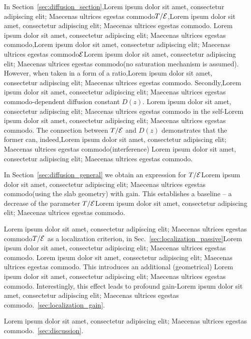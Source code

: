 In Section~\ref{sec:diffusion_section},Lorem ipsum dolor sit amet, consectetur adipiscing elit; Maecenas ultrices egestas commodo$T/{\cal E}$,Lorem ipsum dolor sit amet, consectetur adipiscing elit; Maecenas ultrices egestas commodo. Lorem ipsum dolor sit amet, consectetur adipiscing elit; Maecenas ultrices egestas commodo,Lorem ipsum dolor sit amet, consectetur adipiscing elit; Maecenas ultrices egestas commodo${\cal E}$Lorem ipsum dolor sit amet, consectetur adipiscing elit; Maecenas ultrices egestas commodo(no saturation mechanism is assumed). However, when taken in a form of a ratio,Lorem ipsum dolor sit amet, consectetur adipiscing elit; Maecenas ultrices egestas commodo. Secondly,Lorem ipsum dolor sit amet, consectetur adipiscing elit; Maecenas ultrices egestas commodo-dependent diffusion constant $D(z)$. Lorem ipsum dolor sit amet, consectetur adipiscing elit; Maecenas ultrices egestas commodo\cite{2008_Cherroret,2010_Payne_PRL} in the self-Lorem ipsum dolor sit amet, consectetur adipiscing elit; Maecenas ultrices egestas commodo. The connection between $T/{\cal E}$ and $D(z)$ demonstrates that the former can, indeed,Lorem ipsum dolor sit amet, consectetur adipiscing elit; Maecenas ultrices egestas commodo(interference) Lorem ipsum dolor sit amet, consectetur adipiscing elit; Maecenas ultrices egestas commodo.

In Section~\ref{sec:diffusion_general} we obtain an expression for $T/{\cal E}$Lorem ipsum dolor sit amet, consectetur adipiscing elit; Maecenas ultrices egestas commodo(using the slab geometry) with gain. This establishes a baseline -- a decrease of the parameter $T/{\cal E}$Lorem ipsum dolor sit amet, consectetur adipiscing elit; Maecenas ultrices egestas commodo.

Lorem ipsum dolor sit amet, consectetur adipiscing elit; Maecenas ultrices egestas commodo$T/{\cal E}$ as a localization criterion, in Sec.~\ref{sec:localization_passive}Lorem ipsum dolor sit amet, consectetur adipiscing elit; Maecenas ultrices egestas commodo. Lorem ipsum dolor sit amet, consectetur adipiscing elit; Maecenas ultrices egestas commodo. This introduces an additional (geometrical) Lorem ipsum dolor sit amet, consectetur adipiscing elit; Maecenas ultrices egestas commodo. Interestingly, this effect leads to profound gain-Lorem ipsum dolor sit amet, consectetur adipiscing elit; Maecenas ultrices egestas commodo.~\ref{sec:localization_gain}. 

Lorem ipsum dolor sit amet, consectetur adipiscing elit; Maecenas ultrices egestas commodo.~\ref{sec:discussion}.

